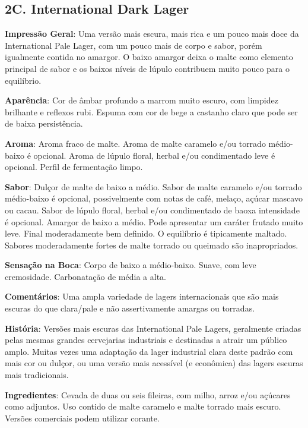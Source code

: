 \subsection*{2C. International Dark Lager}

\textbf{Impressão Geral}: Uma versão mais escura, mais rica e um pouco mais doce da International Pale Lager, com um pouco mais de corpo e sabor, porém igualmente contida no amargor. O baixo amargor deixa o malte como elemento principal de sabor e os baixos níveis de lúpulo contribuem muito pouco para o equilíbrio.

\textbf{Aparência}: Cor de âmbar profundo a marrom muito escuro, com limpidez brilhante e reflexos rubi. Espuma com cor de bege a castanho claro que pode ser de baixa persistência.

\textbf{Aroma}: Aroma fraco de malte. Aroma de malte caramelo e/ou torrado médio-baixo é opcional. Aroma de lúpulo floral, herbal e/ou condimentado leve é opcional. Perfil de fermentação limpo.

\textbf{Sabor}: Dulçor de malte de baixo a médio. Sabor de malte caramelo e/ou torrado médio-baixo é opcional, possivelmente com notas de café, melaço, açúcar mascavo ou cacau. Sabor de lúpulo floral, herbal e/ou condimentado de baoxa intensidade é opcional. Amargor de baixo a médio. Pode apresentar um caráter frutado muito leve. Final moderadamente bem definido. O equilíbrio é tipicamente maltado. Sabores moderadamente fortes de malte torrado ou queimado são inapropriados.

\textbf{Sensação na Boca}: Corpo de baixo a médio-baixo. Suave, com leve cremosidade. Carbonatação de média a alta.

\textbf{Comentários}: Uma ampla variedade de lagers internacionais que são mais escuras do que clara/pale e não assertivamente amargas ou torradas.

\textbf{História}: Versões mais escuras das International Pale Lagers, geralmente criadas pelas mesmas grandes cervejarias industriais e destinadas a atrair um público amplo. Muitas vezes uma adaptação da lager industrial clara deste padrão com mais cor ou dulçor, ou uma versão mais acessível (e econômica) das lagers escuras mais tradicionais.

\textbf{Ingredientes}: Cevada de duas ou seis fileiras, com milho, arroz e/ou açúcares como adjuntos. Uso contido de malte caramelo e malte torrado mais escuro. Versões comerciais podem utilizar corante.


